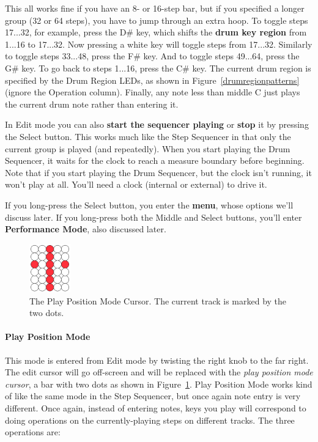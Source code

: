 \documentclass{article}
\begin{document}
This all works fine if you have an 8- or 16-step bar, but if you specified a longer group (32 or 64 steps), you have to jump through an extra hoop.  To toggle steps 17...32, for example, press the D\# key, which shifts the {\bf drum key region} from 1...16 to 17...32.  Now pressing a white key will toggle steps from 17...32.  Similarly to toggle steps 33...48, press the F\# key.  And to toggle steps 49...64, press the G\# key.  To go back to steps 1...16, press the C\# key.  The current drum region is specified by the Drum Region LEDs, as shown in Figure~\ref{drumregionpatterns} (ignore the Operation column).  Finally, any note less than middle C just plays the current drum note rather than entering it.



In Edit mode you can also {\bf start the sequencer playing} or {\bf stop} it by pressing the Select button.  This works much like the Step Sequencer in that only the current group is played (and repeatedly).  When you start playing the Drum Sequencer, it waits for the clock to reach a measure boundary before beginning.  Note that if you start playing the Drum Sequencer, but the clock isn't running, it won't play at all.  You'll need a clock (internal or external) to drive it.

If you long-press the Select button, you enter the {\bf menu}, whose options we'll discuss later.    If you long-press both the Middle and Select buttons, you'll enter {\bf Performance Mode}, also discussed later.

\begin{figure}
\vspace{-1em}
\hspace{\fill}\includegraphics[width=0.7in]{playpositionmode}\hspace{\fill}
\caption{\small The Play Position Mode Cursor.  The current track is marked by the two dots.}
\vspace{-2em}
\label{playpositionmode2}
\end{figure}



\paragraph{Play Position Mode}  This mode is entered from Edit mode by twisting the right knob to the far right.  The edit cursor will go off-screen and will be replaced with the {\it play position mode cursor}, a bar with two dots as shown in Figure~\ref{playpositionmode2}.  Play Position Mode works kind of like the same mode in the Step Sequencer, but once again note entry is very different.   Once again, instead of entering notes, keys you play will correspond to doing operations on the currently-playing steps on different tracks. The three operations are:
\end{document}
